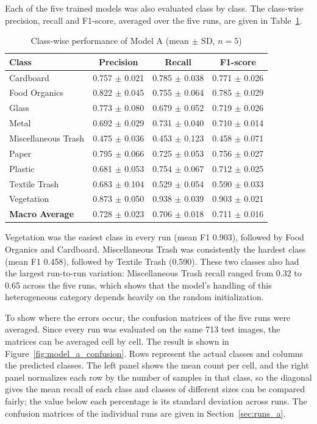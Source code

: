 \documentclass[12pt,a4paper]{article}
\begin{document}
Each of the five trained models was also evaluated class by class. The
class-wise precision, recall and F1-score, averaged over the five runs,
are given in Table~\ref{tab:model_a_classwise}.

\begin{table}[H]
\centering
\caption{Class-wise performance of Model A (mean $\pm$ SD, $n=5$)}
\label{tab:model_a_classwise}
\small
\begin{tabular}{lccc}
\hline
\textbf{Class} & \textbf{Precision} & \textbf{Recall} & \textbf{F1-score} \\
\hline
Cardboard & 0.757 $\pm$ 0.021 & 0.785 $\pm$ 0.038 & 0.771 $\pm$ 0.026 \\
Food Organics & 0.822 $\pm$ 0.045 & 0.755 $\pm$ 0.064 & 0.785 $\pm$ 0.029 \\
Glass & 0.773 $\pm$ 0.080 & 0.679 $\pm$ 0.052 & 0.719 $\pm$ 0.026 \\
Metal & 0.692 $\pm$ 0.029 & 0.731 $\pm$ 0.040 & 0.710 $\pm$ 0.014 \\
Miscellaneous Trash & 0.475 $\pm$ 0.036 & 0.453 $\pm$ 0.123 & 0.458 $\pm$ 0.071 \\
Paper & 0.795 $\pm$ 0.066 & 0.725 $\pm$ 0.053 & 0.756 $\pm$ 0.027 \\
Plastic & 0.681 $\pm$ 0.053 & 0.754 $\pm$ 0.067 & 0.712 $\pm$ 0.025 \\
Textile Trash & 0.683 $\pm$ 0.104 & 0.529 $\pm$ 0.054 & 0.590 $\pm$ 0.033 \\
Vegetation & 0.873 $\pm$ 0.050 & 0.938 $\pm$ 0.039 & 0.903 $\pm$ 0.021 \\
\hline
\textbf{Macro Average} & 0.728 $\pm$ 0.023 & 0.706 $\pm$ 0.018 & 0.711 $\pm$ 0.016 \\
\hline
\end{tabular}
\end{table}

Vegetation was the easiest class in every run (mean F1 0.903), followed
by Food Organics and Cardboard. Miscellaneous Trash was consistently the
hardest class (mean F1 0.458), followed by Textile Trash (0.590). These
two classes also had the largest run-to-run variation: Miscellaneous
Trash recall ranged from 0.32 to 0.65 across the five runs, which shows
that the model's handling of this heterogeneous category depends heavily
on the random initialization.

To show where the errors occur, the confusion matrices of the five runs
were averaged. Since every run was evaluated on the same 713 test
images, the matrices can be averaged cell by cell. The result is shown
in Figure~\ref{fig:model_a_confusion}. Rows represent the actual classes
and columns the predicted classes. The left panel shows the mean count
per cell, and the right panel normalizes each row by the number of
samples in that class, so the diagonal gives the mean recall of each
class and classes of different sizes can be compared fairly; the value
below each percentage is its standard deviation across runs. The
confusion matrices of the individual runs are given in
Section~\ref{sec:runs_a}.
\end{document}
